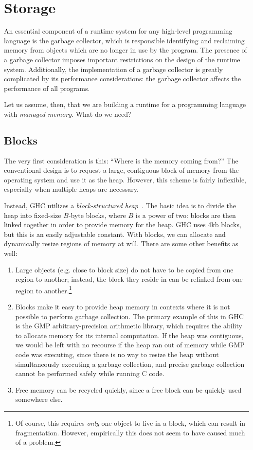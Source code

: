 \section{Storage}

An essential component of a runtime system for any high-level
programming language is the garbage collector, which is responsible
identifying and reclaiming memory from objects which are no longer in
use by the program.
The presence of a garbage collector imposes important restrictions on
the design of the runtime system.  Additionally, the implementation of a
garbage collector is greatly complicated by its performance
considerations: the garbage collector affects the performance of all
programs.

Let us assume, then, that we are building a runtime for a programming
language with \emph{managed memory}.  What do we need?

\subsection{Blocks}

The very first consideration is this: ``Where is the memory coming
from?''  The conventional design is to request a large, contiguous block
of memory from the operating system and use it as the heap.  However,
this scheme is fairly inflexible, especially when multiple heaps are
necessary.

Instead, GHC utilizes a \emph{block-structured heap}~\cite{Marlow:2008:PGG:1375634.1375637}.
The basic idea is to divide the heap into fixed-size $B$-byte blocks,
where $B$ is a power of two: blocks are then linked together in order to
provide memory for the heap.  GHC uses 4kb blocks, but this is an easily
adjustable constant.  With blocks, we can allocate and dynamically
resize regions of memory at will.  There are some other benefits as well:

\begin{enumerate}
    \item Large objects (e.g. close to block size) do not have to be copied from one region to
        another; instead, the block they reside in can be relinked from
        one region to another.\footnote{Of course, this requires \emph{only}
        one object to live in a block, which can result in fragmentation.
        However, empirically this does not seem to have caused much of a problem.}
    \item Blocks make it easy to provide heap memory in contexts where it is
        not possible to perform garbage collection.  The primary example of this
        in GHC is the GMP arbitrary-precision arithmetic library, which requires
        the ability to allocate memory for its internal computation.  If the heap
        was contiguous, we would be left with no recourse if the heap ran out
        of memory while GMP code was executing, since there is no way to resize
        the heap without simultaneously executing a garbage collection, and
        precise garbage collection cannot be performed safely while running C code.
    \item Free memory can be recycled quickly, since a free block can be quickly
        used somewhere else.
\end{enumerate}

